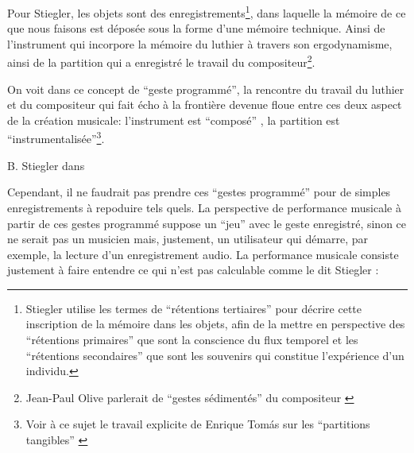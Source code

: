 Pour Stiegler, les objets sont des enregistrements\footnote{Stiegler utilise les termes de ``rétentions tertiaires'' pour décrire cette inscription de la mémoire dans les objets, afin de la mettre en perspective des ``rétentions primaires'' que sont la conscience du flux temporel et les ``rétentions secondaires'' que sont les souvenirs qui constitue l'expérience d'un individu.}, dans laquelle la mémoire de ce que nous faisons est déposée sous la forme d'une mémoire technique. Ainsi de l'instrument qui incorpore la mémoire du luthier à travers son ergodynamisme, ainsi de la partition qui a enregistré le travail du compositeur\footnote{Jean-Paul Olive parlerait de ``gestes sédimentés'' du compositeur \cite{olive_expression_2013}}.

On voit dans ce concept de ``geste programmé'', la rencontre du travail du luthier et du compositeur qui fait écho à la frontière devenue floue entre ces deux aspect de la création musicale: l'instrument est ``composé''  \cite{schnell_introducing_2002}, la partition est ``instrumentalisée''\footnote{Voir à ce sujet le travail explicite de Enrique Tomás sur les ``partitions tangibles'' \cite{tomas_tangible_2014}}.

 B. Stiegler dans \cite{stiegler_circuit_2004}

Cependant, il ne faudrait pas prendre ces ``gestes programmé'' pour de simples enregistrements à repoduire tels quels. La perspective de performance musicale à partir de ces gestes programmé suppose un ``jeu'' avec le geste enregistré, sinon ce ne serait pas un musicien mais, justement, un utilisateur qui démarre, par exemple, la lecture d'un enregistrement audio. La performance musicale consiste justement à faire entendre ce qui n'est pas calculable comme le dit Stiegler \cite{stiegler_circuit_2004}:
 

